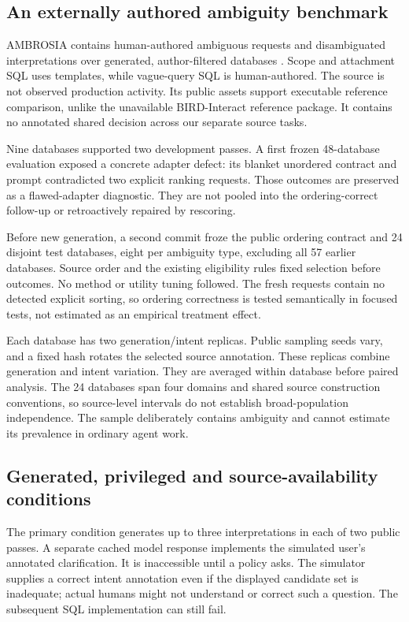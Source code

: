 \documentclass[11pt]{article}
\begin{document}
\subsection{An externally authored ambiguity benchmark}
AMBROSIA contains human-authored ambiguous requests and disambiguated interpretations over generated, author-filtered databases \citep{saparina2024ambrosia}. Scope and attachment SQL uses templates, while vague-query SQL is human-authored. The source is not observed production activity. Its public assets support executable reference comparison, unlike the unavailable BIRD-Interact reference package. It contains no annotated shared decision across our separate source tasks.

Nine databases supported two development passes. A first frozen 48-database evaluation exposed a concrete adapter defect: its blanket unordered contract and prompt contradicted two explicit ranking requests. Those outcomes are preserved as a flawed-adapter diagnostic. They are not pooled into the ordering-correct follow-up or retroactively repaired by rescoring.

Before new generation, a second commit froze the public ordering contract and 24 disjoint test databases, eight per ambiguity type, excluding all 57 earlier databases. Source order and the existing eligibility rules fixed selection before outcomes. No method or utility tuning followed. The fresh requests contain no detected explicit sorting, so ordering correctness is tested semantically in focused tests, not estimated as an empirical treatment effect.

Each database has two generation/intent replicas. Public sampling seeds vary, and a fixed hash rotates the selected source annotation. These replicas combine generation and intent variation. They are averaged within database before paired analysis. The 24 databases span four domains and shared source construction conventions, so source-level intervals do not establish broad-population independence. The sample deliberately contains ambiguity and cannot estimate its prevalence in ordinary agent work.

\subsection{Generated, privileged and source-availability conditions}
The primary condition generates up to three interpretations in each of two public passes. A separate cached model response implements the simulated user's annotated clarification. It is inaccessible until a policy asks. The simulator supplies a correct intent annotation even if the displayed candidate set is inadequate; actual humans might not understand or correct such a question. The subsequent SQL implementation can still fail.
\end{document}
